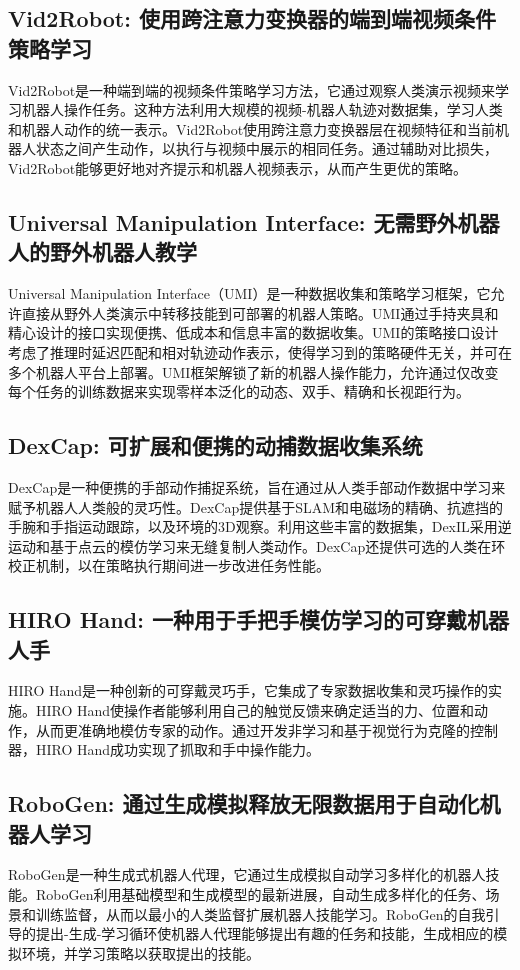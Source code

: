 \documentclass[a4paper]{article}
\begin{document}
\subsection{Vid2Robot: 使用跨注意力变换器的端到端视频条件策略学习}
Vid2Robot是一种端到端的视频条件策略学习方法，它通过观察人类演示视频来学习机器人操作任务。这种方法利用大规模的视频-机器人轨迹对数据集，学习人类和机器人动作的统一表示。Vid2Robot使用跨注意力变换器层在视频特征和当前机器人状态之间产生动作，以执行与视频中展示的相同任务。通过辅助对比损失，Vid2Robot能够更好地对齐提示和机器人视频表示，从而产生更优的策略。

\subsection{Universal Manipulation Interface: 无需野外机器人的野外机器人教学}
Universal Manipulation Interface（UMI）是一种数据收集和策略学习框架，它允许直接从野外人类演示中转移技能到可部署的机器人策略。UMI通过手持夹具和精心设计的接口实现便携、低成本和信息丰富的数据收集。UMI的策略接口设计考虑了推理时延迟匹配和相对轨迹动作表示，使得学习到的策略硬件无关，并可在多个机器人平台上部署。UMI框架解锁了新的机器人操作能力，允许通过仅改变每个任务的训练数据来实现零样本泛化的动态、双手、精确和长视距行为。

\subsection{DexCap: 可扩展和便携的动捕数据收集系统}
DexCap是一种便携的手部动作捕捉系统，旨在通过从人类手部动作数据中学习来赋予机器人人类般的灵巧性。DexCap提供基于SLAM和电磁场的精确、抗遮挡的手腕和手指运动跟踪，以及环境的3D观察。利用这些丰富的数据集，DexIL采用逆运动和基于点云的模仿学习来无缝复制人类动作。DexCap还提供可选的人类在环校正机制，以在策略执行期间进一步改进任务性能。

\subsection{HIRO Hand: 一种用于手把手模仿学习的可穿戴机器人手}
HIRO Hand是一种创新的可穿戴灵巧手，它集成了专家数据收集和灵巧操作的实施。HIRO Hand使操作者能够利用自己的触觉反馈来确定适当的力、位置和动作，从而更准确地模仿专家的动作。通过开发非学习和基于视觉行为克隆的控制器，HIRO Hand成功实现了抓取和手中操作能力。

\subsection{RoboGen: 通过生成模拟释放无限数据用于自动化机器人学习}
RoboGen是一种生成式机器人代理，它通过生成模拟自动学习多样化的机器人技能。RoboGen利用基础模型和生成模型的最新进展，自动生成多样化的任务、场景和训练监督，从而以最小的人类监督扩展机器人技能学习。RoboGen的自我引导的提出-生成-学习循环使机器人代理能够提出有趣的任务和技能，生成相应的模拟环境，并学习策略以获取提出的技能。
\end{document}
